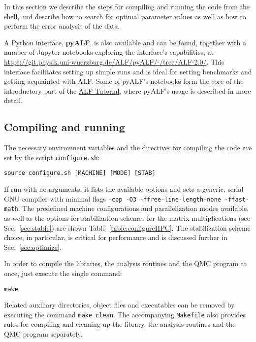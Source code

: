 


In this section we describe the steps for compiling and running the code from the shell, and describe how to search for optimal parameter values as well as how to perform the error analysis of the data.

A Python interface, \textbf{pyALF}, is also available and can be found, together with a number of Jupyter notebooks exploring the interface's capabilities, at \url{https://git.physik.uni-wuerzburg.de/ALF/pyALF/-/tree/ALF-2.0/}. This interface facilitates setting up simple runs and is ideal for setting benchmarks and getting acquainted with ALF. Some of pyALF's notebooks form the core of the introductory part of the \href{https://git.physik.uni-wuerzburg.de/ALF/ALF_Tutorial}{ALF Tutorial}, where pyALF's usage is described in more detail.

\subsection{Compiling and running}
\label{sec:compilation}

The necessary environment variables and the directives for compiling the code are set by the script \texttt{configure.sh}:
\begin{lstlisting}[style=bash]
source configure.sh [MACHINE] [MODE] [STAB]
\end{lstlisting}
If run with no arguments, it lists the available options and sets a generic, serial GNU compiler with minimal flags \texttt{-cpp -O3 -ffree-line-length-none -ffast-math}. The predefined machine configurations and parallelization modes available, as well as the options for stabilization schemes for the matrix multiplications (see Sec.~\ref{sec:stable}) are shown Table~\ref{table:configureHPC}. The stabilization scheme choice, in particular, is critical for performance and is discussed further in Sec.~\ref{sec:optimize}.

In order to compile the libraries, the analysis routines and the QMC program at once, just execute the single command:%
\begin{lstlisting}[style=bash,morekeywords={make}]
make
\end{lstlisting}
Related auxiliary directories, object files and executables can be removed by executing the command \lstinline[style=bash,morekeywords={make}]{make clean}. The accompanying \texttt{Makefile} also provides rules for compiling and cleaning up the library, the analysis routines and the QMC program separately.  

